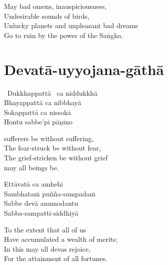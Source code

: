 \begin{english-verses}
  May bad omens, inauspiciousness,\\
  Undesirable sounds of birds,\\
  Unlucky planets and unpleasant bad dreams\\
  Go to ruin by the power of the Saṅgha.
\end{english-verses}

\suttaRef{[Trad]}



\section{Devatā-uyyojana-gāthā}
\label{devata-uyyojana-gatha}

\begin{pali-hangtogether}
  \anglebracketleft\ \hspace{-0.5mm}Dukkhappattā \hspace{-0.5mm}\anglebracketright\ ca niddukkhā\\
  Bhayappattā ca nibbhayā\\
  Sokappattā ca nissokā\\
  Hontu sabbe'pi pāṇino
\end{pali-hangtogether}

\begin{english-verses}
  [May] sufferers be without suffering,\\
  The fear-struck be without fear,\\
  The grief-stricken be without grief\\\relax
  [Thus] may all beings be.
\end{english-verses}

\begin{pali-hang-continued}
  Ettāvatā ca amhehi\\
  Sambhataṁ puñña-sampadaṁ\\
  Sabbe devā anumodantu\makeatletter\hyperlink{endnote128-appendix}\makeatother\\
  Sabba-sampatti-siddhiyā
\end{pali-hang-continued}

\begin{english-verses}
  To the extent that all of us\\
  Have accumulated a wealth of merits;\\
  In this may all devas rejoice,\\
  For the attainment of all fortunes.
\end{english-verses}

